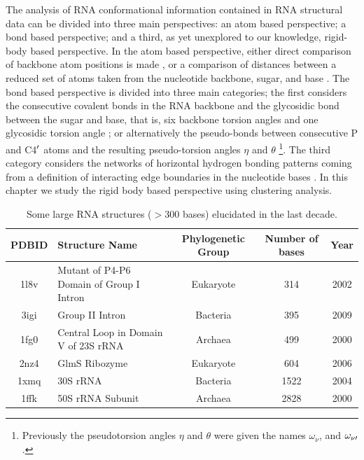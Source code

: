 \noindent The analysis of  RNA conformational information contained in
RNA structural  data can be  divided into three main  perspectives: an
atom based perspective; a bond  based perspective; and a third, as yet
unexplored  to our  knowledge, rigid-body  based perspective.   In the
atom  based perspective,  either  direct comparison  of backbone  atom
positions is  made \cite{reijmers2001},  or a comparison  of distances
between a  reduced set  of atoms taken  from the  nucleotide backbone,
sugar,  and  base \cite{sykes2005}.   The  bond  based perspective  is
divided  into   three  main   categories;  the  first   considers  the
consecutive covalent bonds in the RNA backbone and the glycosidic bond
between the sugar  and base, that is, six  backbone torsion angles and
one   glycosidic   torsion   angle   \cite{reijmers2001,   murray2003,
  hershkovitz2003,  schneider2004, hershkovitz2006};  or alternatively
the  pseudo-bonds between consecutive  P and  C4$^{\rm{\prime}}$ atoms
and   the  resulting   pseudo-torsion  angles   $\eta$   and  $\theta$
\cite{olson1_1972,               duarte1998,               duarte2003,
  wadley2007} \footnote{Previously the pseudotorsion angles $\eta$ and
  $\theta$    were    given     the    names    $\omega_{\nu}$,    and
  $\omega_{\nu\rm{\prime}}$.\cite{malathi1985}}.   The  third category
considers the networks of  horizontal hydrogen bonding patterns coming
from  a definition of  interacting edge  boundaries in  the nucleotide
bases \cite{westhof2000, leontis2002, leontis2006}. In this chapter we
study the rigid body based perspective using clustering analysis.
\begin{table}[htbp]
\begin{center}
{\small
\begin{tabular}{c|p{5cm}|c|c|c}
\hline
\bf{PDBID} & \bf{Structure Name} & \bf{Phylogenetic Group} & \bf{Number of bases} & \bf{Year} \\ \hline
1l8v & Mutant of P4-P6 Domain of Group I Intron & Eukaryote & 314 & 2002 \\ \hline
3igi & Group II Intron & Bacteria & 395 & 2009 \\ \hline
1fg0 & Central Loop in Domain V of 23S rRNA & Archaea & 499 & 2000 \\ \hline
2nz4 & GlmS Ribozyme & Eukaryote & 604 & 2006 \\ \hline
1xmq & 30S rRNA & Bacteria & 1522 & 2004 \\ \hline
1ffk & 50S rRNA Subunit & Archaea & 2828 & 2000 \\ \hline
\end{tabular}
}
\caption{Some large  RNA structures  ($>$300 bases) elucidated  in the
  last decade.}
\end{center}
\label{tab:rnarange}
\end{table}

